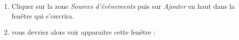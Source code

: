 \begin{enumerate}
	\item Cliquer sur la zone \textit{Sources d'évènements} puis sur \textit{Ajouter} en haut dans la fenêtre qui s'ouvrira.
	\item vous devriez alors voir apparaitre cette fenêtre : 
	\begin{figure}[H]
\begin{center}

\end{center}
\end{figure}
\end{enumerate}
